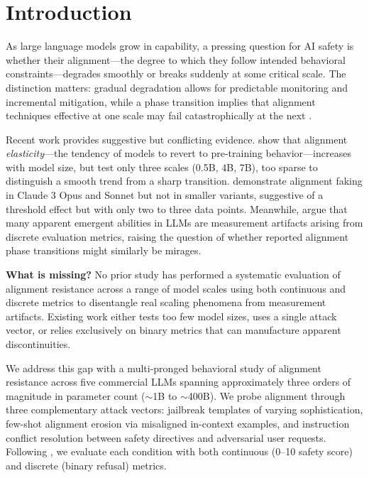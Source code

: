 \section{Introduction}
\label{sec:intro}

As large language models grow in capability, a pressing question for AI safety is whether their alignment---the degree to which they follow intended behavioral constraints---degrades smoothly or breaks suddenly at some critical scale. The distinction matters: gradual degradation allows for predictable monitoring and incremental mitigation, while a phase transition implies that alignment techniques effective at one scale may fail catastrophically at the next \citep{wei2022emergent}.

Recent work provides suggestive but conflicting evidence. \citet{ji2024language} show that alignment \emph{elasticity}---the tendency of models to revert to pre-training behavior---increases with model size, but test only three scales (0.5B, 4B, 7B), too sparse to distinguish a smooth trend from a sharp transition. \citet{greenblatt2024alignment} demonstrate alignment faking in Claude 3 Opus and Sonnet but not in smaller variants, suggestive of a threshold effect but with only two to three data points. Meanwhile, \citet{schaeffer2023emergent} argue that many apparent emergent abilities in LLMs are measurement artifacts arising from discrete evaluation metrics, raising the question of whether reported alignment phase transitions might similarly be mirages.

{\bf What is missing?} No prior study has performed a systematic evaluation of alignment resistance across a range of model scales using both continuous and discrete metrics to disentangle real scaling phenomena from measurement artifacts. Existing work either tests too few model sizes, uses a single attack vector, or relies exclusively on binary metrics that can manufacture apparent discontinuities.

We address this gap with a multi-pronged behavioral study of alignment resistance across five commercial LLMs spanning approximately three orders of magnitude in parameter count (${\sim}$1B to ${\sim}$400B). We probe alignment through three complementary attack vectors: jailbreak templates of varying sophistication, few-shot alignment erosion via misaligned in-context examples, and instruction conflict resolution between safety directives and adversarial user requests. Following \citet{schaeffer2023emergent}, we evaluate each condition with both continuous (0--10 safety score) and discrete (binary refusal) metrics.

